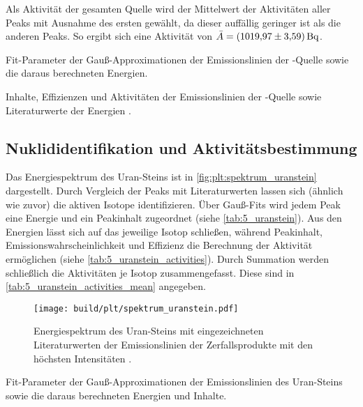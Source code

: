 Als Aktivität der gesamten Quelle wird der Mittelwert der Aktivitäten aller Peaks mit Ausnahme des ersten gewählt,
    da dieser auffällig geringer ist als die anderen Peaks.
So ergibt sich eine Aktivität von $\bar A = \SI{1019.97 \pm 3.59}{\becquerel}$.

\begin{table}
    \centering
    \caption{
        Fit-Parameter der Gauß-Approximationen der Emissionslinien der -Quelle
        sowie die daraus berechneten Energien.
    }
    \label{tab:4_Ba_133}
\end{table}

\begin{table}
    \centering
    \caption{
        Inhalte, Effizienzen und Aktivitäten der Emissionslinien der -Quelle
        sowie Literaturwerte der Energien \cite{lara}.
    }
    \label{tab:4_Ba_133_activities}
\end{table}


\FloatBarrier
\subsection{Nuklididentifikation und Aktivitätsbestimmung} \label{sec:auswertung:uranstein}
Das Energiespektrum des Uran-Steins ist in \autoref{fig:plt:spektrum_uranstein} dargestellt.
Durch Vergleich der Peaks mit Literaturwerten lassen sich
    (ähnlich wie zuvor)
die aktiven Isotope identifizieren.
Über Gauß-Fits
wird jedem Peak eine Energie und ein Peakinhalt zugeordnet
    (siehe \autoref{tab:5_uranstein}).
Aus den Energien lässt sich auf das jeweilige Isotop schließen,
während Peakinhalt, Emissionswahrscheinlichkeit und Effizienz die Berechnung der Aktivität ermöglichen
    (siehe \autoref{tab:5_uranstein_activities}).
Durch Summation werden schließlich die Aktivitäten je Isotop zusammengefasst.
Diese sind in \autoref{tab:5_uranstein_activities_mean} angegeben.

\begin{figure}
    \centering
    \texttt{[image: build/plt/spektrum\_uranstein.pdf]}
    \caption{Energiespektrum des Uran-Steins mit eingezeichneten Literaturwerten der Emissionslinien der Zerfallsprodukte mit den höchsten Intensitäten \cite{lara}.}
    \label{fig:plt:spektrum_uranstein}
\end{figure}

\begin{table}
    \centering
    \caption{
        Fit-Parameter der Gauß-Approximationen der Emissionslinien des Uran-Steins
        sowie die daraus berechneten Energien und Inhalte.
    }
    \label{tab:5_uranstein}
\end{table}

